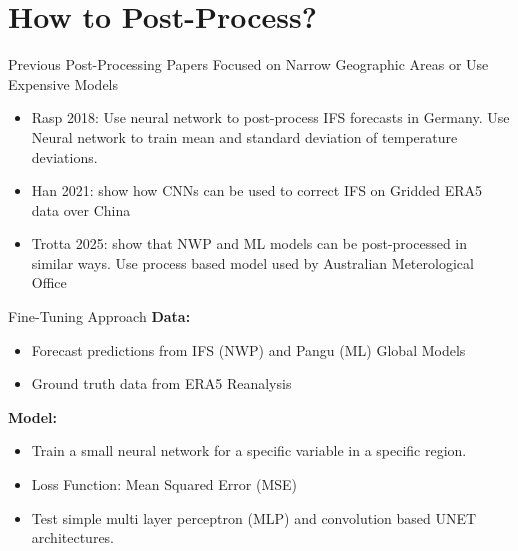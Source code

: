 \documentclass[aspectratio=169, xcolor=dvipsnames]{beamer}
\begin{document}
\section{How to Post-Process?}

\begin{frame}{Previous Post-Processing Papers Focused on Narrow Geographic Areas or Use Expensive Models}
    \begin{itemize}
        \item Rasp 2018: Use neural network to post-process IFS forecasts in Germany. Use Neural network to train mean and standard deviation of temperature deviations. 
        \item Han 2021: show how CNNs can be used to correct IFS on Gridded ERA5 data over China
        \item Trotta 2025: show that NWP and ML models can be post-processed in similar ways. Use process based model used by Australian Meterological Office
    \end{itemize}

\end{frame}

\begin{frame}{Fine-Tuning Approach}
    \hypertarget{FineTuning}{} %
    \textbf{Data:}
    \begin{itemize}
        \item Forecast predictions from IFS (NWP) and Pangu (ML) Global Models
        \item Ground truth data from ERA5 Reanalysis
    \end{itemize}

    \textbf{Model:}
    \begin{itemize}
        \item Train a small neural network for a specific variable in a specific region.
        \item Loss Function: Mean Squared Error (MSE)
        \item Test simple multi layer perceptron (MLP) and convolution based UNET architectures.
    \end{itemize}
\hyperlink{TrainingDetails}{}
\hyperlink{Neural Net Background}{}
\end{frame}
    
\end{document}
